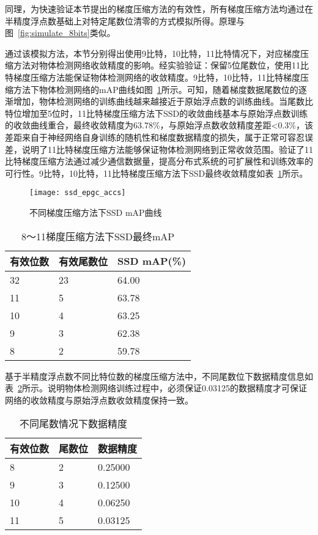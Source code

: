 同理，为快速验证本节提出的梯度压缩方法的有效性，所有梯度压缩方法均通过在半精度浮点数基础上对特定尾数位清零的方式模拟所得。原理与图~\ref{fig:simulate_8bits}类似。

通过该模拟方法，本节分别得出使用9比特，10比特，11比特情况下，对应梯度压缩方法对物体检测网络收敛精度的影响。经实验验证：保留5位尾数位，使用11比特梯度压缩方法能保证物体检测网络的收敛精度。9比特，10比特，11比特梯度压缩方法下物体检测网络的mAP曲线如图~\ref{fig:ssd_epgc_accs}所示。可知，随着梯度数据尾数位的逐渐增加，物体检测网络的训练曲线越来越接近于原始浮点数的训练曲线。当尾数比特位增加至5位时，11比特梯度压缩方法下SSD的收敛曲线基本与原始浮点数训练的收敛曲线重合，最终收敛精度为63.78\%，与原始浮点数收敛精度差距<0.3\%，该差距来自于神经网络自身训练的随机性和梯度数据精度的损失，属于正常可容忍误差，说明了11比特梯度压缩方法能够保证物体检测网络到正常收敛范围。验证了11比特梯度压缩方法通过减少通信数据量，提高分布式系统的可扩展性和训练效率的可行性。9比特，10比特，11比特梯度压缩方法下SSD最终收敛精度如表~\ref{tab:ssd_epdc_final_accs}所示。

\begin{figure}[htp]
\centering
\texttt{[image: ssd\_epgc\_accs]}
\caption{不同梯度压缩方法下SSD mAP曲线}
\label{fig:ssd_epgc_accs}
\end{figure}

\begin{table}[htb]
\centering
\noindent\begin{minipage}{0.6\textwidth}
\centering
\caption{8～11梯度压缩方法下SSD最终mAP}
\label{tab:ssd_epdc_final_accs}
\begin{tabular}{p{2cm}p{2cm}p{2.5cm}}
\toprule[1.5pt]
有效位数 & 有效尾数位 & SSD mAP(\%) \\\midrule[1pt]
32 & 23 & 64.00 \\
11 & 5 &  63.78 \\
10 & 4 & 63.25 \\
9 & 3 & 62.38 \\
8 & 2 & 59.78 \\
\midrule[1pt]
\end{tabular}
\end{minipage}
\end{table}

基于半精度浮点数不同比特位数的梯度压缩方法中，不同尾数位下数据精度信息如表~\ref{tab:ssd_epdc_precisions}所示。说明物体检测网络训练过程中，必须保证0.03125的数据精度才可保证网络的收敛精度与原始浮点数收敛精度保持一致。

\begin{table}[htb]
\centering
\noindent\begin{minipage}{0.5\textwidth}
\centering
\caption{不同尾数情况下数据精度}
\label{tab:ssd_epdc_precisions}
\begin{tabular}{p{2cm}p{2cm}p{2cm}}
\toprule[1.5pt]
有效位数 & 尾数位 & 数据精度 \\\midrule[1pt]
8 & 2 & 0.25000 \\
9 & 3 & 0.12500 \\
10 & 4 & 0.06250 \\
11 & 5 & 0.03125 \\
\midrule[1pt]
\end{tabular}
\end{minipage}
\end{table}

